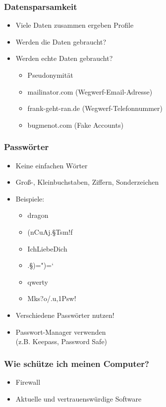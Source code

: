 \documentclass[12pt]{beamer}
\begin{document}
\begin{frame}
    \frametitle{Datensparsamkeit}
    \begin{itemize}
        \item<2-> Viele Daten zusammen ergeben Profile
        \item<3-> Werden die Daten gebraucht?
        \item<4-> Werden echte Daten gebraucht?
            \begin{itemize}
              \item<5-> Pseudonymität
              \item<6-> mailinator.com (Wegwerf-Email-Adresse)
	      \item<7-> frank-geht-ran.de (Wegwerf-Telefonnummer)
              \item<8-> bugmenot.com (Fake Accounts)
            \end{itemize}
    \end{itemize}
\end{frame}

\begin{frame}
    \frametitle{Passwörter}
    \begin{itemize}
        \item<2-> Keine einfachen Wörter
        \item<3-> Groß-, Kleinbuchstaben, Ziffern, Sonderzeichen
        \item<4-> Beispiele:
            \begin{itemize}
                \item<5-> dragon
                \item<6-> (nCuAj.§Tsm!f
                \item<7-> IchLiebeDich
                \item<8-> .§)=")=`
                \item<10-> qwerty
                \item<11-> Mks?o/.u,1Psw!
            \end{itemize}
        \item<12-> Verschiedene Passwörter nutzen!
        \item<13-> Passwort-Manager verwenden \\ (z.B. Keepass, Password Safe)
    \end{itemize}
\end{frame}

\begin{frame}
    \frametitle{Wie schütze ich meinen Computer?}
    \begin{itemize}
      \item Firewall
      \item Aktuelle und vertrauenswürdige Software
    \end{itemize}
\end{frame}
\end{document}
